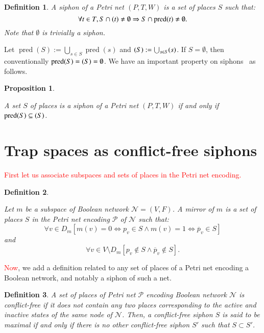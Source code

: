 \documentclass[preprint,12pt]{elsarticle}
\newtheorem{definition}{Definition}[section]
\newtheorem{proposition}{Proposition}[section]
\newcommand{\change}[1]{\textcolor{red}{#1}}
\DeclareMathOperator{\pred}{pred}
\let\succ\relax
\DeclareMathOperator{\succ}{succ}
\begin{document}
\begin{definition}

  A \emph{siphon} of a Petri net \((P, T, W)\) is a set of places \(S\) such that:
  \[\forall t\in T, S\cap \succ(t)\not =\emptyset\Rightarrow S\cap \pred(t)\not =\emptyset.\]
  Note that \(\emptyset\) is trivially a siphon.

\end{definition}

Let \(\pred(S) := \bigcup_{s \in S}\pred(s)\) and \(\succ(S) := \bigcup_{s \in S}\succ(s)\).
If \(S = \emptyset\), then conventionally \(\pred(S) = \succ(S) = \emptyset\).
We have an important property on siphons~\cite{DBLP:journals/isci/LiuB16} as follows.

\begin{proposition}%
\label{prop:siphon_set}

  A set \(S\) of places is a siphon of a Petri net \((P, T, W)\) if and only if \(\pred(S) \subseteq \succ(S)\).

\end{proposition}


\section{Trap spaces as conflict-free siphons}%
\label{sec:Main_finding}

\change{First let us associate subspaces and sets of places in the Petri net encoding.}
\begin{definition}\label{def:mirror}

  Let \(m\) be a subspace of Boolean network \(\mathcal{N} = (V, F)\).
  A \emph{mirror} of \(m\) is a set of places \(S\) in the Petri net encoding \(\mathcal{P}\) of \(\mathcal{N}\) such that:
  \[\forall v \in D_m \left[m(v) = 0 \Leftrightarrow p_v \in S \land m(v) = 1 \Leftrightarrow \overline{p}_v \in S\right]\] and \[\forall v \in V \setminus D_m \left[p_v \not \in S \land \overline{p}_v \not \in S\right].\]

\end{definition}

\change{Now}, we add a definition related to any set of places of a Petri net encoding a Boolean network, and notably a siphon of such a net.

\begin{definition}

  A set of places of Petri net \(\mathcal{P}\) encoding Boolean network \(\mathcal{N}\) is \emph{conflict-free} if it does not contain any two places corresponding to the active and inactive states of the same \emph{node} of \(\mathcal{N}\).
  Then, a conflict-free siphon \(S\) is said to be \emph{maximal} if and only if there is no other conflict-free siphon \(S'\) such that \(S \subset S'\).

\end{definition}
\end{document}
